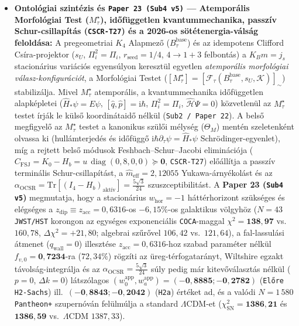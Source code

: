 \documentclass[11pt,a4paper]{article}
\begin{document}
\begin{itemize}[leftmargin=1.5em]
\item \textbf{Ontológiai szintézis és \texttt{Paper 23 (Sub4 v5)} --- Atemporális Morfológiai Test ($M_\tau^\star$), id\H{o}független kvantummechanika, passzív Schur-csillapítás (\texttt{CSCR-T27}) és a 2026-os sötétenergia-válság feloldása:} A pregeometriai $K_4$ Alapmez\H{o} ($B_\tau^{\mathrm{base}}$) és az idempotens Clifford Csíra-projektor ($s_U$, $\Pi_i^2 = \Pi_i$, $r_{\mathrm{seed}} = 1/4$, $4 \to 1 + 3$ felbontás) a $K_B m = j_s$ stacionárius variációs egyensúlyon keresztül egyetlen \emph{atemporális morfológiai válasz-konfigurációt}, a Morfológiai Testet ($[M_\tau^\star] = [\mathcal{F}_\tau(B_\tau^{\mathrm{base}}, s_U, \mathcal{K})]_\sim$) stabilizálja. Mivel $M_\tau^\star$ atemporális, a kvantummechanika id\H{o}független alapképletei ($\hat{H}_*\psi = E\psi$, $[\hat{q},\hat{p}] = \mathrm{i}\hbar$, $\Pi_i^2 = \Pi_i$, $\hat{\mathcal{H}}\Psi = 0$) közvetlenül az $M_\tau^\star$ testet írják le küls\H{o} koordinátaid\H{o} nélkül (\texttt{Sub2 / Paper 22}). A bels\H{o} megfigyel\H{o} az $M_\tau^\star$ testet a kanonikus szül\H{o}i mélység ($\Theta_M$) mentén szeletenként olvassa ki (hullámterjedés és id\H{o}függ\H{o} $\mathrm{i}\hbar\partial_\tau\psi = \hat{H}_*\psi$ Schr\"odinger-egyenlet), míg a rejtett bels\H{o} módusok Feshbach--Schur--Jacobi eliminációja ($C_{\mathrm{FSJ}} = K_0 - H_b = u\,\operatorname{diag}(0,8,0,0) \succeq \mathbf{0}$, \texttt{CSCR-T27}) el\H{o}állítja a passzív terminális Schur-csillapítást, a $\hat{m}_{\mathrm{eff}} = 2{,}12055$ Yukawa-árnyékolást és az $\alpha_{\mathrm{OCSR}} = \mathrm{Tr}[(I_4 - H_b)_{\text{aktív}}] = \frac{5\sqrt{3}}{24}$ szuszceptibilitást. A \textbf{Paper 23 (\texttt{Sub4 v5})} megmutatja, hogy a stacionárius $w_{\mathrm{hor}} = -1$ háttérhorizont szükséges és elégséges a $z_{\mathrm{dip}} \equiv z_{\mathrm{acc}} = 0{,}6316$-os $-6{,}15\%$-os galaktikus völgyhöz ($N=43$ \texttt{JWST/HST} korongon az egységes exponenciális \texttt{COCA}-maggal $\chi^2 = \mathbf{138{,}97}$ vs.\ $160{,}78$, $\Delta\chi^2 = +21{,}80$; algebrai sz\H{u}r\H{o}vel $106{,}42$ vs.\ $121{,}64$), a fal-lassulási átmenet ($q_{\mathrm{wall}} = 0$) illesztése $z_{\mathrm{acc}} = 0{,}6316$-hoz szabad paraméter nélkül $f_{v,0} = \mathbf{0{,}7234}$-ra ($72{,}34\%$) rögzíti az üreg-térfogatarányt, Wiltshire egzakt távolság-integrálja és az $\alpha_{\mathrm{OCSR}} = \frac{5\sqrt{3}}{24}$ súly pedig már kitev\H{o}választás nélkül ($p = 0$, $\Delta k = 0$) látszólagos $(w_0^{\mathrm{app}}, w_a^{\mathrm{app}}) = (\mathbf{-0{,}8885}; \mathbf{-0{,}2782})$ (\texttt{El\H{o}re H2-Sachs}) ill.\ $(\mathbf{-0{,}8843}; \mathbf{-0{,}2042})$ (\texttt{H2a}) értéket ad, és a valódi $N = 1\,580$ \texttt{Pantheon+} szupernóván felülmúlja a standard $\Lambda$CDM-et ($\chi^2_{\mathrm{SN}} = \mathbf{1386{,}21}$ és $\mathbf{1386{,}59}$ vs.\ $\Lambda$CDM $1387{,}33$).
\end{itemize}
\end{document}
